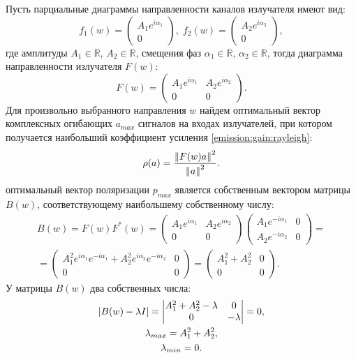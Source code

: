 Пусть парциальные диаграммы направленности каналов излучателя имеют вид:
\[
    f_1(w) = \begin{pmatrix}
                 A_1 e^{i \alpha_1} \\
                 0
    \end{pmatrix}
    , \;
    f_2(w) = \begin{pmatrix}
                 A_2 e^{i \alpha_2} \\
                 0
    \end{pmatrix} ,
\]
где амплитуды $A_1 \in \mathbb{R}$, $A_2 \in \mathbb{R}$, смещения фаз $\alpha_1 \in \mathbb{R}$, $\alpha_2 \in \mathbb{R}$, тогда диаграмма направленности
излучателя $F(w)$:
\[
    F(w) = \begin{pmatrix}
               A_1 e^{i \alpha_1} & A_2 e^{i \alpha_2} \\
               0   & 0
    \end{pmatrix} .
\]
Для произвольно выбранного направления $w$ найдем оптимальный вектор комплексных огибающих $a_{max}$ сигналов на входах излучателей,
при котором получается наибольший коэффициент усиления \eqref{emission:gain:rayleigh}:
\[
    \rho(a)
    = \frac{\left \| F(w) a \right \|^2}{\left \| a \right \|^2}.
\]
оптимальный вектор поляризации $p_{max}$ является собственным вектором матрицы $B(w)$, соответствующему наибольшему собственному числу:
\begin{multline*}
    B(w)
    = F(w) F^*(w)
    = \begin{pmatrix}
          A_1 e^{i \alpha_1} & A_2 e^{i \alpha_2} \\
          0   & 0
    \end{pmatrix}
    \begin{pmatrix}
        A_1 e^{- i \alpha_1} & 0 \\
        A_2 e^{- i \alpha_2} & 0
    \end{pmatrix} = \\
    = \begin{pmatrix}
          A_1^2 e^{i \alpha_1} e^{- i \alpha_1} + A_2^2 e^{i \alpha_2} e^{- i \alpha_2} & 0 \\
          0             & 0
    \end{pmatrix}
    = \begin{pmatrix}
          A_1^2 + A_2^2 & 0 \\
          0             & 0
    \end{pmatrix} .
\end{multline*}
У матрицы $B(w)$ два собственных числа:
\begin{gather*}
    \left | B(w) - \lambda I \right |
    = \begin{vmatrix}
          A_1^2 + A_2^2 - \lambda & 0 \\
          0                       & - \lambda
    \end{vmatrix} = 0, \\
    \lambda_{max} = A_1^2 + A_2^2 , \\
    \lambda_{min} = 0 .
\end{gather*}
